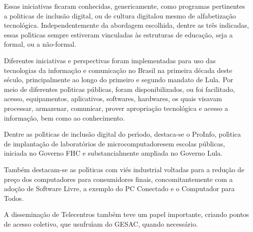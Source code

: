 \documentclass[
12pt,		%
openright,	%
twoside,  %
a4paper,			%
chapter=TITLE,		%
english,			%
french,				%
spanish,			%
brazil				%
]{USPSC-classe/USPSC}
\begin{document}
Essas iniciativas ficaram conhecidas, genericamente, como programas pertinentes a politicas de \textquotedbl inclus\~ao digital, ou  de \textquotedbl cultura digital\textquotedbl  ou mesmo de \textquotedbl alfabetiza\c{c}\~ao tecnol\'ogica\textquotedbl . Independentemente da abordagem escolhida, dentre as tr\^es indicadas, essas pol\'{\i}ticas sempre estiveram vinculadas \`as estruturas de educa\c{c}\~ao, seja a formal, ou a n\~ao-formal.










Diferentes iniciativas e perspectivas foram implementadas para uso das tecnologias da informa\c{c}\~ao e comunica\c{c}\~ao no Brasil na primeira d\'ecada deste s\'eculo, principalmente ao longo do primeiro e segundo mandato de Lula. Por meio de diferentes pol\'{\i}ticas p\'ublicas, foram disponibilizados, ou foi facilitado, acesso, equipamentos, aplicativos, softwares, hardwares, os quais visavam processar, armazenar, comunicar, prover apropria\c{c}\~ao tecnol\'ogica e acesso a  informa\c{c}\~ao, bem como ao conhecimento.










Dentre as pol\'{\i}ticas de inclus\~ao digital do per\'{\i}odo, destaca-se o ProInfo, pol\'{\i}tica de implanta\c{c}\~ao de \textquotedbl laborat\'orios de microcomputadores\textquotedbl  em escolas p\'ublicas, iniciada no Governo FHC e substancialmente ampliada no Governo Lula.










Tamb\'em destacam-se as pol\'{\i}ticas com vi\'es industrial voltadas para a redu\c{c}\~ao de pre\c{c}o dos computadores para consumidores finais, concomitantemente com a ado\c{c}\~ao de Software Livre, a exemplo do PC Conectado e o Computador para Todos.










A dissemina\c{c}\~ao de Telecentros tamb\'em teve um papel importante, criando pontos de acesso coletivo, que usufru\'{\i}am do GESAC, quando necess\'ario.
\end{document}
